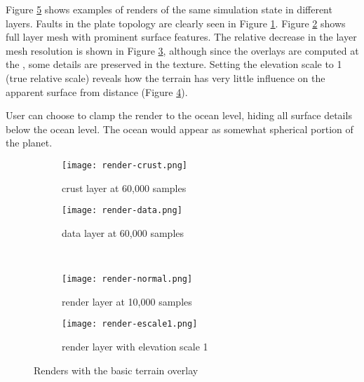 Figure \ref{fig:render-layers} shows examples of renders of the same simulation state in different layers. Faults in the plate topology are clearly seen in Figure \ref{fig:render-crust}. Figure \ref{fig:render-data} shows full  layer mesh with prominent surface features. The relative decrease in the  layer mesh resolution is shown in Figure \ref{fig:render-normal}, although since the overlays are computed at the , some details are preserved in the texture. Setting the elevation scale to 1 (true relative scale) reveals how the terrain has very little influence on the apparent surface from distance (Figure \ref{fig:render-escale1}).

User can choose to clamp the render to the ocean level, hiding all surface details below the ocean level. The ocean would appear as somewhat spherical portion of the planet.

\begin{figure}[ht]
\centering
\begin{subfigure}{7cm}
\texttt{[image: render-crust.png]}
\caption{crust layer at 60,000 samples}
\label{fig:render-crust}
\end{subfigure}
\hspace*{1cm}
\begin{subfigure}{7cm}
\texttt{[image: render-data.png]}
\caption{data layer at 60,000 samples}
\label{fig:render-data}
\end{subfigure}\\
\begin{subfigure}{7cm}
\texttt{[image: render-normal.png]}
\caption{render layer at 10,000 samples}
\label{fig:render-normal}
\end{subfigure}
\hspace*{1cm}
\begin{subfigure}{7cm}
\texttt{[image: render-escale1.png]}
\caption{render layer with elevation scale 1}
\label{fig:render-escale1}
\end{subfigure}
\caption{Renders with the basic terrain overlay}
\label{fig:render-layers}
\end{figure}
